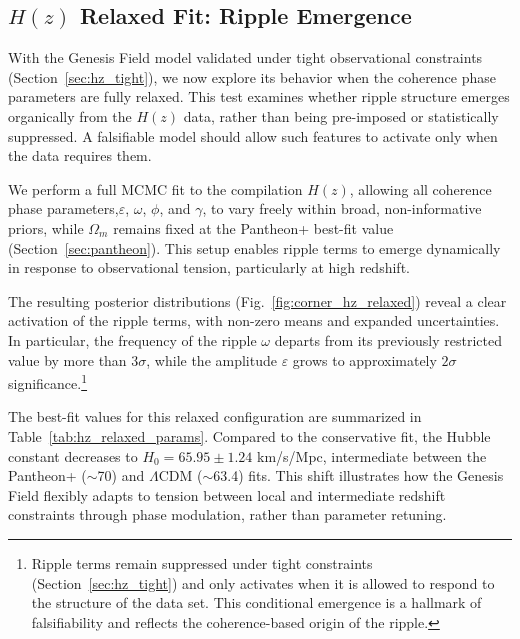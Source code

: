 \subsection{\texorpdfstring{$H(z)$}{Hz} Relaxed Fit: Ripple Emergence}
\label{sec:hz_relaxed}

With the Genesis Field model validated under tight observational constraints (Section~\ref{sec:hz_tight}), we now explore its behavior when the coherence phase parameters are fully relaxed. This test examines whether ripple structure emerges organically from the $H(z)$ data, rather than being pre-imposed or statistically suppressed. A falsifiable model should allow such features to activate only when the data requires them.

We perform a full MCMC fit to the compilation $H(z)$, allowing all coherence phase parameters,$\varepsilon$, $\omega$, $\phi$, and $\gamma$, to vary freely within broad, non-informative priors, while $\Omega_m$ remains fixed at the Pantheon+ best-fit value (Section~\ref{sec:pantheon}). This setup enables ripple terms to emerge dynamically in response to observational tension, particularly at high redshift.

The resulting posterior distributions (Fig.~\ref{fig:corner_hz_relaxed}) reveal a clear activation of the ripple terms, with non-zero means and expanded uncertainties. In particular, the frequency of the ripple $\omega$ departs from its previously restricted value by more than $3\sigma$, while the amplitude $\varepsilon$ grows to approximately $2\sigma$ significance.\footnote{Ripple terms remain suppressed under tight constraints (Section~\ref{sec:hz_tight}) and only activates when it is allowed to respond to the structure of the data set. This conditional emergence is a hallmark of falsifiability and reflects the coherence-based origin of the ripple.}

The best-fit values for this relaxed configuration are summarized in Table~\ref{tab:hz_relaxed_params}. Compared to the conservative fit, the Hubble constant decreases to $H_0 = 65.95 \pm 1.24$ km/s/Mpc, intermediate between the Pantheon+ ($\sim$70) and $\Lambda$CDM ($\sim$63.4) fits. This shift illustrates how the Genesis Field flexibly adapts to tension between local and intermediate redshift constraints through phase modulation, rather than parameter retuning.

